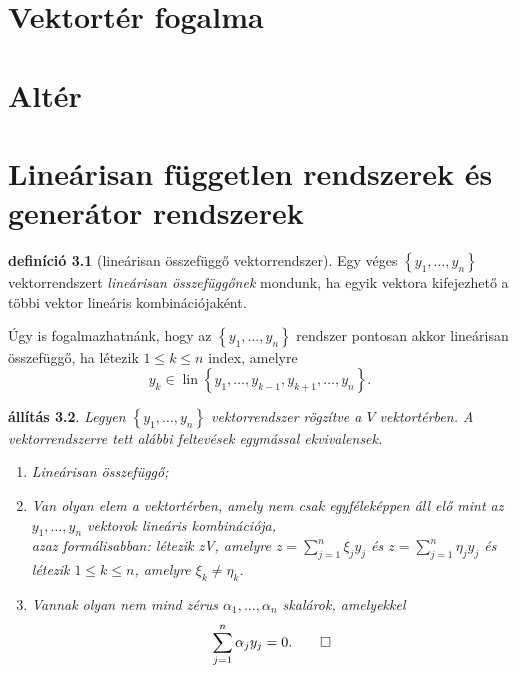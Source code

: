 \documentclass[9pt,showtrims]{memoir}
\theoremstyle{plain}
\newtheorem{proposition}{állítás}[chapter]
\theoremstyle{remark}
\theoremstyle{definition}
\newtheorem{definition}[proposition]{definíció}
\DeclareMathOperator{\lin}{lin}
\begin{document}
\chapter{Vektortér fogalma}
\chapter{Altér}
\chapter{Lineárisan független rendszerek és generátor rendszerek}
\begin{definition}[lineárisan összefüggő vektorrendszer]
    Egy véges $\left\{ y_1,\dots,y_n \right\}$ vektorrendszert \emph{lineárisan összefüggőnek}
    mondunk, ha egyik vektora kifejezhető a többi vektor lineáris kombinációjaként.
\end{definition}
Úgy is fogalmazhatnánk, hogy az $\left\{ y_1,\dots,y_n \right\}$ rendszer pontosan akkor
lineárisan összefüggő, ha létezik $1\leq k\leq n$ index, amelyre
\[
    y_k\in\lin\left\{ y_1,\dots,y_{k-1},y_{k+1},\dots,y_n \right\}.
\]
\begin{proposition}
    Legyen $\left\{ y_1,\dots,y_n \right\}$ vektorrendszer rögzítve a $V$ vektortérben.
    A vektorrendszerre tett alábbi feltevések egymással ekvivalensek.
    \begin{enumerate}
        \item Lineárisan összefüggő;
        \item Van olyan elem a vektortérben, amely nem csak egyféleképpen áll elő mint az $y_1,\dots,y_n$
            vektorok lineáris kombinációja,\\
            azaz formálisabban:
            létezik z\in V, amelyre $z=\sum_{j=1}^n\xi_jy_j$ és $z=\sum_{j=1}^n\eta_jy_j$
            és létezik $1\leq k\leq n$, amelyre $\xi_k\neq\eta_k$.
        \item Vannak olyan nem mind zérus $\alpha_1,\dots,\alpha_n$ skalárok, amelyekkel
            \[
                \sum_{j=1}^n\alpha_jy_j=0.\qedhere
            \]
    \end{enumerate}
\end{proposition}
\end{document}
